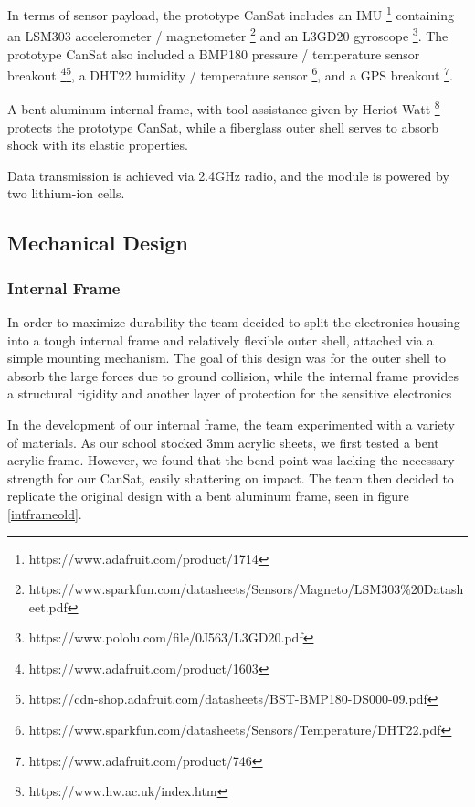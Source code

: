 \documentclass[]{report}
\begin{document}
		In terms of sensor payload, the prototype CanSat includes an IMU \footnote{https://www.adafruit.com/product/1714} containing an LSM303 accelerometer / magnetometer \footnote{https://www.sparkfun.com/datasheets/Sensors/Magneto/LSM303\%20Datasheet.pdf} and an L3GD20 gyroscope \footnote{https://www.pololu.com/file/0J563/L3GD20.pdf}. The prototype CanSat also included a BMP180 pressure / temperature sensor breakout \footnote{https://www.adafruit.com/product/1603}\footnote{https://cdn-shop.adafruit.com/datasheets/BST-BMP180-DS000-09.pdf}, a DHT22 humidity / temperature sensor \footnote{https://www.sparkfun.com/datasheets/Sensors/Temperature/DHT22.pdf}, and a GPS breakout \footnote{https://www.adafruit.com/product/746}.
		
		 A bent aluminum internal frame, with tool assistance given by Heriot Watt \footnote{https://www.hw.ac.uk/index.htm} protects the prototype CanSat, while a fiberglass outer shell serves to absorb shock with its elastic properties.
		 
		 Data transmission is achieved via 2.4GHz radio, and the module is powered by two lithium-ion cells.
		 \subsection{Mechanical Design}
		 \subsubsection{Internal Frame}
		 In order to maximize durability the team decided to split the electronics housing into a tough internal frame and relatively flexible outer shell, attached via a simple mounting mechanism. The goal of this design was for the outer shell to absorb the large forces due to ground collision, while the internal frame provides a structural rigidity and another layer of protection for the sensitive electronics
		 
		 In the development of our internal frame, the team experimented with a variety of materials. As our school stocked 3mm acrylic sheets, we first tested a bent acrylic frame. However, we found that the bend point was lacking the necessary strength for our CanSat, easily shattering on impact. The team then decided to replicate the original design with a bent aluminum frame, seen in figure \ref{intframeold}. 
		 
		 
\end{document}
